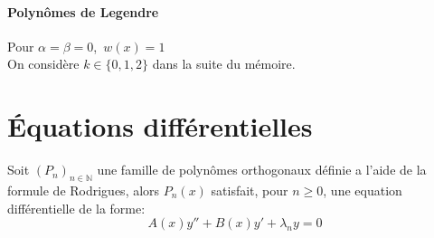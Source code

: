 \paragraph{Polynômes de Legendre}
$ $\\
Pour $\alpha=\beta=0$,\ $w(x)=1$
\\$ $\\$ $\\$ $\\On considère $k\in\lbrace0, 1, 2\rbrace$ dans la suite du mémoire.

\section{Équations différentielles}
\bthm
$ $\\Soit $(P_{n})_{n\in\mathbb{N}}$ une famille de polynômes orthogonaux définie a l'aide de la formule de Rodrigues, alors $P_{n}(x)$ satisfait, pour $n\geqslant0$, une equation différentielle de la forme: $$A(x)y''+B(x)y'+\lambda_{n}y=0$$
\ethm

